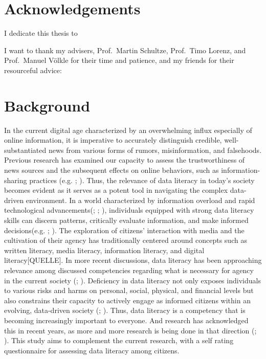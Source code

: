 \documentclass[
  12pt,
  a4paper,
  twoside]{article}
\begin{document}
\section*{Acknowledgements}\label{acknowledgements}

I dedicate this thesis to

I want to thank my advisers, Prof.~Martin Schultze, Prof.~Timo Lorenz,
and Prof.~Manuel Völkle for their time and patience, and my friends for
their resourceful advice:

\newpage\null\thispagestyle{empty}\newpage

\section{Background}\label{background}

In the current digital age characterized by an overwhelming influx
especially of online information, it is imperative to accurately
distinguish credible, well-substantiated news from various forms of
rumors, misinformation, and falsehoods. Previous research has examined
our capacity to assess the trustworthiness of news sources and the
subsequent effects on online behaviors, such as information-sharing
practices (e.g. ;
). Thus, the
relevance of data literacy in today's society becomes evident as it
serves as a potent tool in navigating the complex data-driven
environment. In a world characterized by information overload and rapid
technological advancements(;
;
), individuals equipped with
strong data literacy skills can discern patterns, critically evaluate
information, and make informed decisions(e.g.
; ). The exploration of citizens' interaction with media and
the cultivation of their agency has traditionally centered around
concepts such as written literacy, media literacy, information literacy,
and digital literacy{[}QUELLE{]}. In more recent discussions, data
literacy has been approaching relevance among discussed competencies
regarding what is necessary for agency in the current society
(;
). Deficiency in data
literacy not only exposes individuals to various risks and harms on
personal, social, physical, and financial levels but also constrains
their capacity to actively engage as informed citizens within an
evolving, data-driven society (; ). Thus, data
literacy is a competency that is becoming increasingly important to
everyone. And research has acknowledged this in recent years, as more
and more research is being done in that direction
(; ). This study aims to complement the current research, with
a self rating questionnaire for assessing data literacy among citizens.
\end{document}
